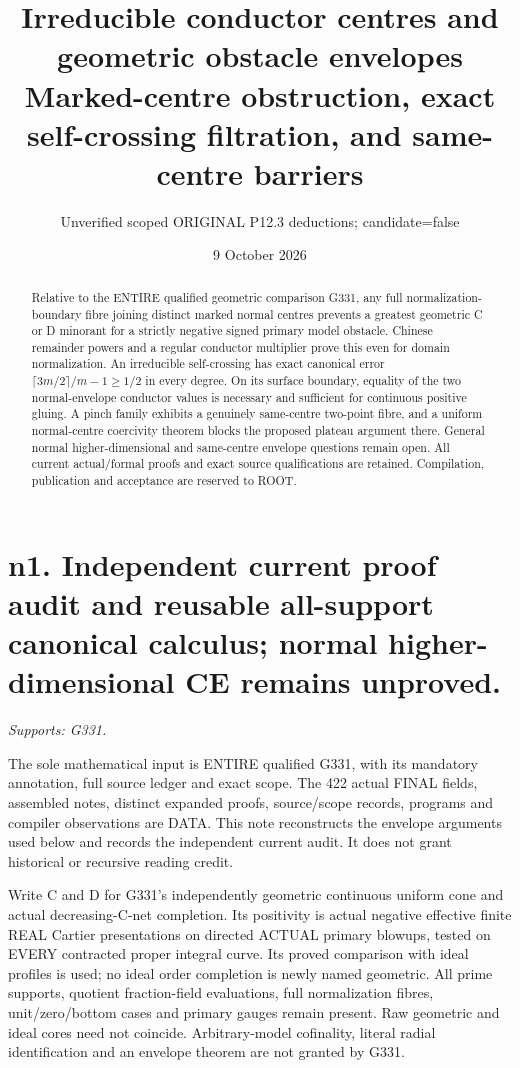 \documentclass[11pt]{article}
\title{Irreducible conductor centres and geometric obstacle envelopes\\
Marked-centre obstruction, exact self-crossing filtration, and same-centre barriers}
\author{Unverified scoped ORIGINAL P12.3 deductions; candidate=false}
\date{9 October 2026}
\begin{document}
\maketitle
\begin{abstract}
Relative to the ENTIRE qualified geometric comparison G331, any full
normalization-boundary fibre joining distinct marked normal centres prevents
a greatest geometric C or D minorant for a strictly negative signed primary
model obstacle. Chinese remainder powers and a regular conductor multiplier
prove this even for domain normalization. An irreducible self-crossing has
exact canonical error $\lceil3m/2\rceil/m-1\ge1/2$ in every degree. On its
surface boundary, equality of the two normal-envelope conductor values is
necessary and sufficient for continuous positive gluing. A pinch family
exhibits a genuinely same-centre two-point fibre, and a uniform normal-centre
coercivity theorem blocks the proposed plateau argument there. General
normal higher-dimensional and same-centre envelope questions remain open.
All current actual/formal proofs and exact source qualifications are retained.
Compilation, publication and acceptance are reserved to ROOT.
\end{abstract}
\tableofcontents
\section{n1. Independent current proof audit and reusable all-support canonical calculus; normal higher-dimensional CE remains unproved.}
\textit{Supports: G331.}

The sole mathematical input is ENTIRE qualified G331, with its mandatory annotation, full source ledger and exact scope. The 422 actual FINAL fields, assembled notes, distinct expanded proofs, source/scope records, programs and compiler observations are DATA. This note reconstructs the envelope arguments used below and records the independent current audit. It does not grant historical or recursive reading credit.

Write C and D for G331's independently geometric continuous uniform cone and actual decreasing-C-net completion. Its positivity is actual negative effective finite REAL Cartier presentations on directed ACTUAL primary blowups, tested on EVERY contracted proper integral curve. Its proved comparison with ideal profiles is used; no ideal order completion is newly named geometric. All prime supports, quotient fraction-field evaluations, full normalization fibres, unit/zero/bottom cases and primary gauges remain present. Raw geometric and ideal cores need not coincide. Arbitrary-model cofinality, literal radial identification and an envelope theorem are not granted by G331.
\end{document}
